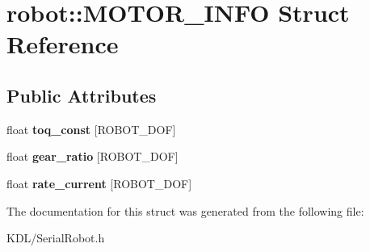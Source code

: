 \hypertarget{structrobot_1_1_m_o_t_o_r___i_n_f_o}{}\section{robot\+:\+:M\+O\+T\+O\+R\+\_\+\+I\+N\+FO Struct Reference}
\label{structrobot_1_1_m_o_t_o_r___i_n_f_o}
\subsection*{Public Attributes}
\begin{DoxyCompactItemize}
\item 
\mbox{\label{structrobot_1_1_m_o_t_o_r___i_n_f_o_ab7b9b3c3807ee1d2956955c70dc24f04}} 
float {\bfseries toq\+\_\+const} \mbox{[}R\+O\+B\+O\+T\+\_\+\+D\+OF\mbox{]}
\item 
\mbox{\label{structrobot_1_1_m_o_t_o_r___i_n_f_o_a31e05e07a14eb543df3daf5166054d8c}} 
float {\bfseries gear\+\_\+ratio} \mbox{[}R\+O\+B\+O\+T\+\_\+\+D\+OF\mbox{]}
\item 
\mbox{\label{structrobot_1_1_m_o_t_o_r___i_n_f_o_a656e251dd15b595a4991702c57ec8b35}} 
float {\bfseries rate\+\_\+current} \mbox{[}R\+O\+B\+O\+T\+\_\+\+D\+OF\mbox{]}
\end{DoxyCompactItemize}


The documentation for this struct was generated from the following file\+:\begin{DoxyCompactItemize}
\item 
K\+D\+L/Serial\+Robot.\+h\end{DoxyCompactItemize}
